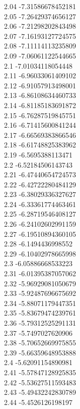 {2.04	-7.31586678452181\\
2.05	-7.26429374656127\\
2.06	-7.21298202843498\\
2.07	-7.16193127724575\\
2.08	-7.11114113235809\\
2.09	-7.06061122544665\\
2.1	-7.01034118054448\\
2.11	-6.96033061409102\\
2.12	-6.91057913498001\\
2.13	-6.86108634460733\\
2.14	-6.81185183691872\\
2.15	-6.76287519845751\\
2.16	-6.71415600841244\\
2.17	-6.66569383866546\\
2.18	-6.61748825383962\\
2.19	-6.5695388113471\\
2.2	-6.52184506143743\\
2.21	-6.47440654724573\\
2.22	-6.42722280484129\\
2.23	-6.38029336327627\\
2.24	-6.33361774463461\\
2.25	-6.28719546408127\\
2.26	-6.24102602991159\\
2.27	-6.19510894360105\\
2.28	-6.1494436998552\\
2.29	-6.10402978665998\\
2.3	-6.05886668533223\\
2.31	-6.01395387057062\\
2.32	-5.96929081050679\\
2.33	-5.92487696675692\\
2.34	-5.88071179447351\\
2.35	-5.83679474239761\\
2.36	-5.79312525291131\\
2.37	-5.7497027620906\\
2.38	-5.70652669975855\\
2.39	-5.66359648953888\\
2.4	-5.62091154890981\\
2.41	-5.57847128925835\\
2.42	-5.53627511593483\\
2.43	-5.49432242830789\\
2.44	-5.4526126198197\\
}
